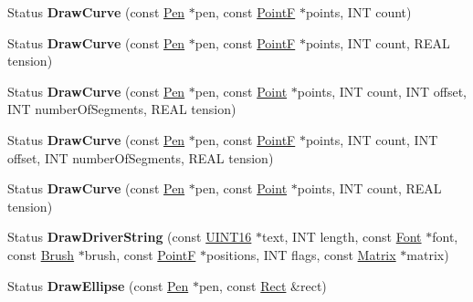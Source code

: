 \begin{DoxyCompactItemize}
\mbox{\label{class_graphics_a1e85c05297632a0d8e85fb82ab39fea4}} 
Status {\bfseries Draw\+Curve} (const \hyperlink{class_pen}{Pen} $\ast$pen, const \hyperlink{struct_point_f}{PointF} $\ast$points, I\+NT count)
\item 
\mbox{\label{class_graphics_a6483a09a621579e93a2ebb429b0c806d}} 
Status {\bfseries Draw\+Curve} (const \hyperlink{class_pen}{Pen} $\ast$pen, const \hyperlink{struct_point_f}{PointF} $\ast$points, I\+NT count, R\+E\+AL tension)
\item 
\mbox{\label{class_graphics_acb52b0090c019b12848b58fcd9f86f93}} 
Status {\bfseries Draw\+Curve} (const \hyperlink{class_pen}{Pen} $\ast$pen, const \hyperlink{struct_point}{Point} $\ast$points, I\+NT count, I\+NT offset, I\+NT number\+Of\+Segments, R\+E\+AL tension)
\item 
\mbox{\label{class_graphics_a274aff1a64d0861b0caa07ad434cf489}} 
Status {\bfseries Draw\+Curve} (const \hyperlink{class_pen}{Pen} $\ast$pen, const \hyperlink{struct_point_f}{PointF} $\ast$points, I\+NT count, I\+NT offset, I\+NT number\+Of\+Segments, R\+E\+AL tension)
\item 
\mbox{\label{class_graphics_a4fa943942705d3102085495cede31b7e}} 
Status {\bfseries Draw\+Curve} (const \hyperlink{class_pen}{Pen} $\ast$pen, const \hyperlink{struct_point}{Point} $\ast$points, I\+NT count, R\+E\+AL tension)
\item 
\mbox{\label{class_graphics_a702d90c86170db885638fb4d0ac3d59f}} 
Status {\bfseries Draw\+Driver\+String} (const \hyperlink{_processor_bind_8h_a09f1a1fb2293e33483cc8d44aefb1eb1}{U\+I\+N\+T16} $\ast$text, I\+NT length, const \hyperlink{class_font}{Font} $\ast$font, const \hyperlink{class_brush}{Brush} $\ast$brush, const \hyperlink{struct_point_f}{PointF} $\ast$positions, I\+NT flags, const \hyperlink{class_matrix}{Matrix} $\ast$matrix)
\item 
\mbox{\label{class_graphics_af9a0023ba976e84ce2b67421d9619017}} 
Status {\bfseries Draw\+Ellipse} (const \hyperlink{class_pen}{Pen} $\ast$pen, const \hyperlink{struct_rect}{Rect} \&rect)
\item 
\mbox{\label{class_graphics_abbbe881ba5f5c74ff9b5c6a938c667f7}} 

\end{DoxyCompactItemize}
